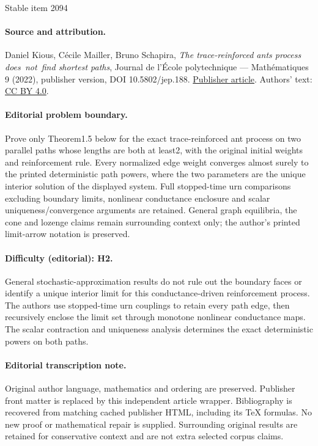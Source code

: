\documentclass[11pt]{article}
\numberwithin{equation}{section}
\theoremstyle{definition}
\begin{document}
\begin{center}{\Large Stable item 2094}\end{center}
\paragraph{Source and attribution.}
Daniel Kious, Cécile Mailler, Bruno Schapira, \emph{The trace-reinforced ants process does not find shortest paths}, Journal de l’École polytechnique — Mathématiques 9 (2022), publisher version, DOI 10.5802/jep.188. \href{https://jep.centre-mersenne.org/articles/10.5802/jep.188/}{Publisher article}. Authors' text: \href{https://creativecommons.org/licenses/by/4.0/}{CC BY 4.0}.
\paragraph{Editorial problem boundary.}
Prove only Theorem1.5 below for the exact trace-reinforced ant process on two parallel paths whose lengths are both at least2, with the original initial weights and reinforcement rule. Every normalized edge weight converges almost surely to the printed deterministic path powers, where the two parameters are the unique interior solution of the displayed system. Full stopped-time urn comparisons excluding boundary limits, nonlinear conductance enclosure and scalar uniqueness/convergence arguments are retained. General graph equilibria, the cone and lozenge claims remain surrounding context only; the author's printed limit-arrow notation is preserved.
\paragraph{Difficulty (editorial): H2.}
General stochastic-approximation results do not rule out the boundary faces or identify a unique interior limit for this conductance-driven reinforcement process. The authors use stopped-time urn couplings to retain every path edge, then recursively enclose the limit set through monotone nonlinear conductance maps. The scalar contraction and uniqueness analysis determines the exact deterministic powers on both paths.
\paragraph{Editorial transcription note.}
Original author language, mathematics and ordering are preserved. Publisher front matter is replaced by this independent article wrapper. Bibliography is recovered from matching cached publisher HTML, including its TeX formulas. No new proof or mathematical repair is supplied. Surrounding original results are retained for conservative context and are not extra selected corpus claims.
\clearpage
\end{document}
